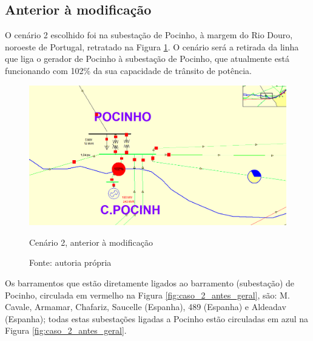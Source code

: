 \subsection{Anterior à modificação}

O cenário 2 escolhido foi na subestação de Pocinho, à margem do Rio Douro, noroeste de Portugal, retratado na Figura \ref{fig:caso_2_antes_geral_menor}. O cenário será a retirada da linha que liga o gerador de Pocinho à subestação de Pocinho, que atualmente está funcionando com 102\% da sua capacidade de trânsito de potência.

\begin{figure}[H]
	\centering
	\captionsetup{width=\textwidth, font=footnotesize, textfont=bf}	
	\includegraphics[width=\linewidth]{img/caso_2_antes_geral.PNG}
	\caption{Cenário 2, anterior à modificação}
	\vspace{-3.5mm}
	\caption*{Fonte: autoria própria}
	\label{fig:caso_2_antes_geral_menor}
\end{figure}

Os barramentos que estão diretamente ligados ao barramento (subestação) de Pocinho, circulada em vermelho na Figura \ref{fig:caso_2_antes_geral}, são: M. Cavale, Armamar, Chafariz, Saucelle (Espanha), 489 (Espanha) e Aldeadav (Espanha); todas estas subestações ligadas a Pocinho estão circuladas em azul na Figura \ref{fig:caso_2_antes_geral}.

